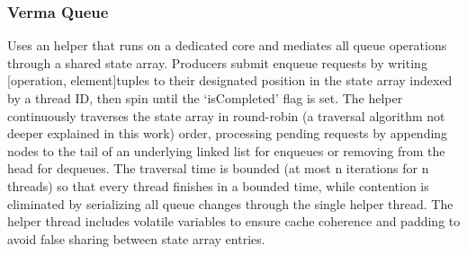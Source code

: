 \subsubsection{Verma Queue} 
Uses an helper that runs on a dedicated core and mediates all queue operations through a shared state array. Producers submit enqueue requests by writing [operation, element]tuples to their designated position in the state array indexed by a thread ID, then spin until the \enquote*{isCompleted} flag is set. The helper continuously traverses the state array in round-robin (a traversal algorithm not deeper explained in this work) order, processing pending requests by appending nodes to the tail of an underlying linked list for enqueues or removing from the head for dequeues. The traversal time is bounded (at most n iterations for n threads) so that every thread finishes in a bounded time, while contention is eliminated by serializing all queue changes through the single helper thread. The helper thread includes volatile variables to ensure cache coherence and padding to avoid false sharing between state array entries. \cite{Verma2013Scalable}

